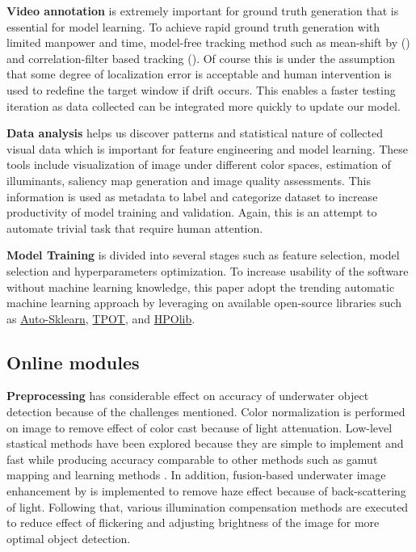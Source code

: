 \documentclass[hyp]{socreport}
\begin{document}
\textbf{Video annotation} is extremely important for ground truth
generation that is essential for model learning. To achieve rapid ground truth
generation with limited manpower and time, model-free tracking method such as
mean-shift by () and correlation-filter based tracking
(). Of course this is under the assumption that some
degree of localization error is acceptable and human intervention is used to
redefine the target window if drift occurs. This enables a faster testing
iteration as data collected can be integrated more quickly to update our model.

\textbf{Data analysis} helps us discover patterns and statistical nature of
collected visual data which is important for feature engineering and model
learning. These tools include visualization of image under different color
spaces, estimation of illuminants, saliency map generation and image quality
assessments. This information is used as metadata to label and categorize
dataset to increase productivity of model training and validation. Again, this
is an attempt to automate trivial task that require human attention.

\textbf{Model Training} is divided into several stages such as feature
selection, model selection and hyperparameters optimization. To increase
usability of the software without machine learning knowledge, this paper adopt the trending
automatic machine learning approach by leveraging on available open-source
libraries such as \href{https://github.com/automl/auto-sklearn}{Auto-Sklearn},
\href{https://github.com/rhiever/tpot}{TPOT}, and \href{https://github.com/automl/HPOlib}{HPOlib}.

\subsection{Online modules}

\textbf{Preprocessing} has considerable effect on accuracy of underwater object
detection because of the challenges mentioned. Color normalization is performed
on image to remove effect of color cast because of light attenuation. Low-level
stastical methods have been explored because they are simple to implement and
fast while producing accuracy comparable to other methods such as gamut mapping
and learning methods . In addition, fusion-based
underwater image enhancement by  is implemented to
remove haze effect because of back-scattering of light. Following that, various
illumination compensation methods are executed to reduce effect of flickering and
adjusting brightness of the image for more optimal object detection.
\end{document}
